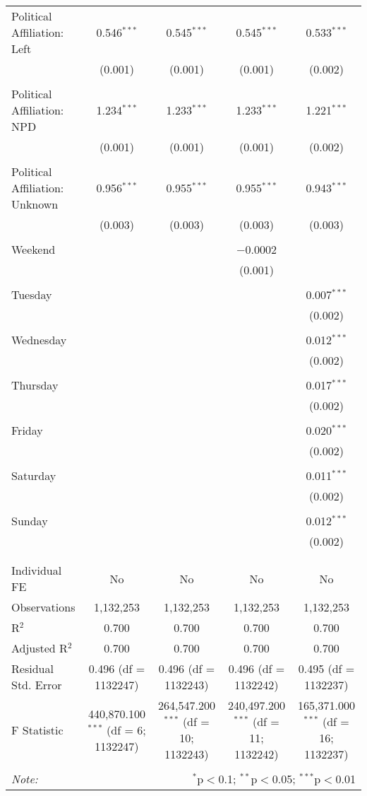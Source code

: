 \documentclass[
]{article}
\begin{document}
\begin{table}[!htbp]
{\begin{tabular}{@{\extracolsep{5pt}}lcccc}
 Political Affiliation: Left & 0.546$^{***}$ & 0.545$^{***}$ & 0.545$^{***}$ & 0.533$^{***}$ \\ 
  & (0.001) & (0.001) & (0.001) & (0.002) \\ 
  & & & & \\ 
 Political Affiliation: NPD & 1.234$^{***}$ & 1.233$^{***}$ & 1.233$^{***}$ & 1.221$^{***}$ \\ 
  & (0.001) & (0.001) & (0.001) & (0.002) \\ 
  & & & & \\ 
 Political Affiliation: Unknown & 0.956$^{***}$ & 0.955$^{***}$ & 0.955$^{***}$ & 0.943$^{***}$ \\ 
  & (0.003) & (0.003) & (0.003) & (0.003) \\ 
  & & & & \\ 
 Weekend &  &  & $-$0.0002 &  \\ 
  &  &  & (0.001) &  \\ 
  & & & & \\ 
 Tuesday &  &  &  & 0.007$^{***}$ \\ 
  &  &  &  & (0.002) \\ 
  & & & & \\ 
 Wednesday &  &  &  & 0.012$^{***}$ \\ 
  &  &  &  & (0.002) \\ 
  & & & & \\ 
 Thursday &  &  &  & 0.017$^{***}$ \\ 
  &  &  &  & (0.002) \\ 
  & & & & \\ 
 Friday &  &  &  & 0.020$^{***}$ \\ 
  &  &  &  & (0.002) \\ 
  & & & & \\ 
 Saturday &  &  &  & 0.011$^{***}$ \\ 
  &  &  &  & (0.002) \\ 
  & & & & \\ 
 Sunday &  &  &  & 0.012$^{***}$ \\ 
  &  &  &  & (0.002) \\ 
  & & & & \\ 
\hline \\[-1.8ex] 
Individual FE & No & No & No & No \\ 
Observations & 1,132,253 & 1,132,253 & 1,132,253 & 1,132,253 \\ 
R$^{2}$ & 0.700 & 0.700 & 0.700 & 0.700 \\ 
Adjusted R$^{2}$ & 0.700 & 0.700 & 0.700 & 0.700 \\ 
Residual Std. Error & 0.496 (df = 1132247) & 0.496 (df = 1132243) & 0.496 (df = 1132242) & 0.495 (df = 1132237) \\ 
F Statistic & 440,870.100$^{***}$ (df = 6; 1132247) & 264,547.200$^{***}$ (df = 10; 1132243) & 240,497.200$^{***}$ (df = 11; 1132242) & 165,371.000$^{***}$ (df = 16; 1132237) \\ 
\hline 
\hline \\[-1.8ex] 
\textit{Note:}  & \multicolumn{4}{r}{$^{*}$p$<$0.1; $^{**}$p$<$0.05; $^{***}$p$<$0.01} \\ 
\end{tabular}
} 
\end{table} 
\newpage
\end{document}
